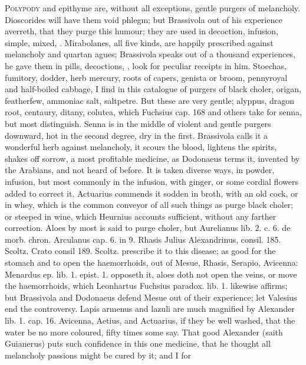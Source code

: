 {\lettrine{P}{olypody} and epithyme are, without all exceptions, gentle purgers of
melancholy. Dioscorides will have them void phlegm; but Brassivola out
of his experience averreth, that they purge this humour; they are used
in decoction, infusion, \etc{} simple, mixed, \etc{}.
Mirabolanes, all five kinds, are happily prescribed against
melancholy and quartan agues; Brassivola speaks out of a thousand
experiences, he gave them in pills, decoctions, \etc{}, look for peculiar
receipts in him.
Stoechas, fumitory, dodder, herb mercury, roots of capers, genista or
broom, pennyroyal and half-boiled cabbage, I find in this catalogue of
purgers of black choler, origan, featherfew, ammoniac salt,
saltpetre. But these are very gentle; alyppus, dragon root, centaury,
ditany, colutea, which Fuchsius cap. 168 and others take for senna, but
most distinguish. Senna is in the middle of violent and gentle purgers
downward, hot in the second degree, dry in the first. Brassivola calls
it a wonderful herb against melancholy, it scours the blood,
lightens the spirits, shakes off sorrow, a most profitable medicine, as
 Dodonaeus terms it, invented by the Arabians, and not heard of
before. It is taken diverse ways, in powder, infusion, but most
commonly in the infusion, with ginger, or some cordial flowers added to
correct it. Actuarius commends it sodden in broth, with an old cock, or
in whey, which is the common conveyor of all such things as purge black
choler; or steeped in wine, which Heurnius accounts sufficient, without
any farther correction.
Aloes by most is said to purge choler, but Aurelianus lib. 2. c. 6. de
morb. chron. Arculanus cap. 6. in 9. Rhasis Julius Alexandrinus,
consil. 185. Scoltz. Crato consil 189. Scoltz. prescribe it to this
disease; as good for the stomach and to open the haemorrhoids, out of
Mesue, Rhasis, Serapio, Avicenna: Menardus ep. lib. 1. epist. 1.
opposeth it, aloes doth not open the veins, or move the
haemorrhoids, which Leonhartus Fuchsius paradox. lib. 1. likewise
affirms; but Brassivola and Dodonaeus defend Mesue out of their
experience; let Valesius end the controversy.
Lapis armenus and lazuli are much magnified by Alexander lib. 1.
cap. 16. Avicenna, Aetius, and Actuarius, if they be well washed, that
the water be no more coloured, fifty times some say. That good
Alexander (saith Guianerus) puts such confidence in this one medicine,
that he thought all melancholy passions might be cured by it; and I for
}
